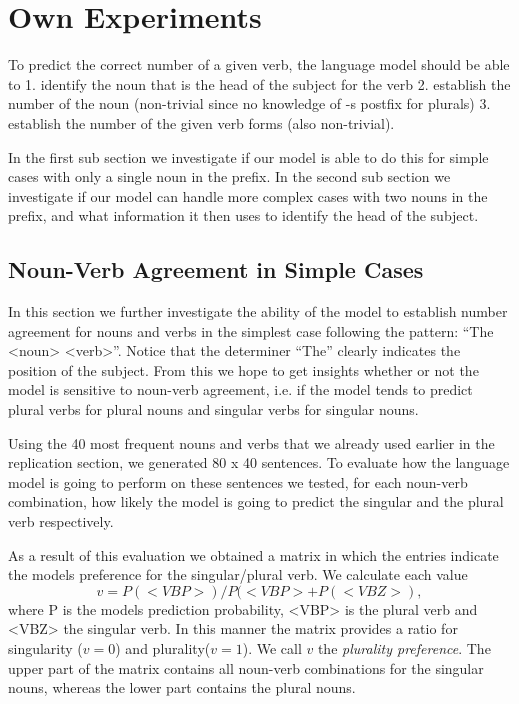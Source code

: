 \section{Own Experiments}
\label{own-experiments}
To predict the correct number of a given verb,
the language model should be able to
1. identify the noun that is the head of the subject for the verb
2. establish the number of the noun (non-trivial since no knowledge of -s postfix for plurals)
3. establish the number of the given verb forms (also non-trivial).

In the first sub section we investigate if our model is able to
do this for simple cases with only a single noun in the prefix.
%
In the second sub section we investigate if our model can handle
more complex cases with two nouns in the prefix,
and what information it then uses to identify the head of the subject.


\subsection{Noun-Verb Agreement in Simple Cases}

In this section we further investigate the ability of the model to
establish number agreement for nouns and verbs in the simplest case
following the pattern: ``The <noun> <verb>''. Notice that
the determiner ``The'' clearly indicates the position of the subject.
From this we hope to get insights whether or not the model is sensitive to noun-verb agreement, i.e. if the model tends to predict plural verbs for plural nouns and singular verbs for singular nouns.


Using the 40 most frequent nouns and verbs that we already used earlier in the replication section, we generated 80 x 40 sentences. To evaluate how the language model is going to perform on these sentences we tested, for each noun-verb combination, how likely the model is going to predict the singular and the plural verb respectively.

As a result of this evaluation we obtained a matrix in which the entries indicate the models preference for the singular/plural verb. We calculate each value
\begin{equation}
	v = P(<VBP>)/ P(<VBP> + P(<VBZ>), 
\end{equation}
where P is the models prediction probability, <VBP> is the plural verb and <VBZ> the singular verb. In this manner the matrix provides a ratio for singularity ($v=0$) and plurality($v=1$). We call $v$ the \textit{plurality preference}. The upper part of the matrix contains all noun-verb combinations for the singular nouns, whereas the lower part contains the plural nouns. 

